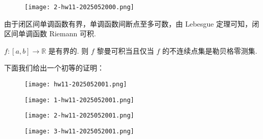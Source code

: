 \begin{exercise}
\begin{figure}[H]
\centering
\texttt{[image: 2-hw11-2025052000.png]}
\label{}
\end{figure}
\end{exercise}
\begin{note}
由于闭区间单调函数有界，单调函数间断点至多可数，由 Lebesgue 定理可知，闭区间单调函数 Riemann 可积.
\end{note}
\begin{theorem}[Lebesgue 定理]
$f:[a, b] \rightarrow \mathbb{R}$ 是有界的. 则 $f$ 黎曼可积当且仅当 $f$ 的不连续点集是勒贝格零测集.
\end{theorem}
下面我们给出一个初等的证明：

\begin{figure}[H]
\centering
\texttt{[image: hw11-2025052001.png]}
\label{}
\end{figure}
\begin{figure}[H]
\centering
\texttt{[image: 1-hw11-2025052001.png]}
\label{}
\end{figure}

\begin{figure}[H]
\centering
\texttt{[image: 2-hw11-2025052001.png]}
\label{}
\end{figure}
\begin{figure}[H]
\centering
\texttt{[image: 3-hw11-2025052001.png]}
\label{}
\end{figure}
